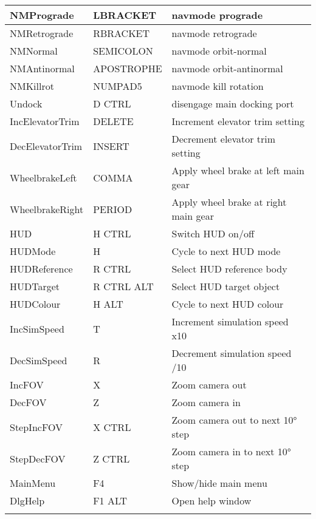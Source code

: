 \documentclass[Orbiter Developer Manual.tex]{subfiles}
\begin{document}
\begin{longtable}{ |p{}|p{}|p{}| }
	\hline\rule{0pt}{2ex}
	NMPrograde & LBRACKET & navmode prograde\\
	\hline\rule{0pt}{2ex}
	NMRetrograde & RBRACKET & navmode retrograde\\
	\hline\rule{0pt}{2ex}
	NMNormal & SEMICOLON & navmode orbit-normal\\
	\hline\rule{0pt}{2ex}
	NMAntinormal & APOSTROPHE & navmode orbit-antinormal\\
	\hline\rule{0pt}{2ex}
	NMKillrot & NUMPAD5 & navmode kill rotation\\
	\hline\rule{0pt}{2ex}
	Undock & D CTRL & disengage main docking port\\
	\hline\rule{0pt}{2ex}
	IncElevatorTrim & DELETE & Increment elevator trim setting\\
	\hline\rule{0pt}{2ex}
	DecElevatorTrim & INSERT & Decrement elevator trim setting\\
	\hline\rule{0pt}{2ex}
	WheelbrakeLeft & COMMA & Apply wheel brake at left main gear\\
	\hline\rule{0pt}{2ex}
	WheelbrakeRight & PERIOD & Apply wheel brake at right main gear\\
	\hline\rule{0pt}{2ex}
	HUD & H CTRL & Switch HUD on/off\\
	\hline\rule{0pt}{2ex}
	HUDMode & H & Cycle to next HUD mode\\
	\hline\rule{0pt}{2ex}
	HUDReference & R CTRL & Select HUD reference body\\
	\hline\rule{0pt}{2ex}
	HUDTarget & R CTRL ALT & Select HUD target object\\
	\hline\rule{0pt}{2ex}
	HUDColour & H ALT & Cycle to next HUD colour\\
	\hline\rule{0pt}{2ex}
	IncSimSpeed & T & Increment simulation speed x10\\
	\hline\rule{0pt}{2ex}
	DecSimSpeed & R & Decrement simulation speed /10\\
	\hline\rule{0pt}{2ex}
	IncFOV & X & Zoom camera out\\
	\hline\rule{0pt}{2ex}
	DecFOV & Z & Zoom camera in\\
	\hline\rule{0pt}{2ex}
	StepIncFOV & X CTRL & Zoom camera out to next 10° step\\
	\hline\rule{0pt}{2ex}
	StepDecFOV & Z CTRL & Zoom camera in to next 10° step\\
	\hline\rule{0pt}{2ex}
	MainMenu & F4 & Show/hide main menu\\
	\hline\rule{0pt}{2ex}
	DlgHelp & F1 ALT & Open help window\\
	\hline\rule{0pt}{2ex}

\end{longtable}
\end{document}
